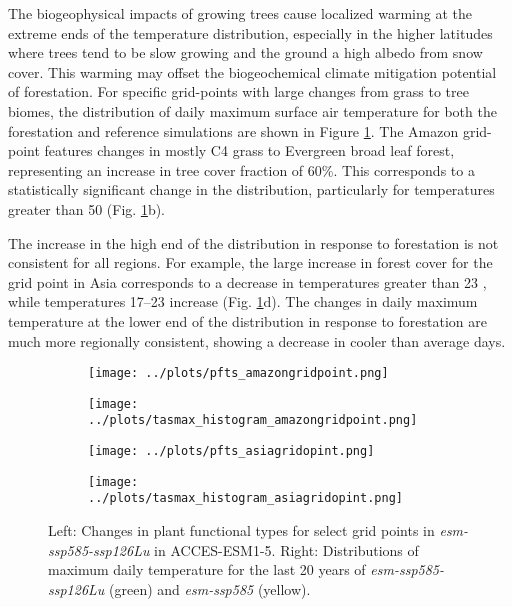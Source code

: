 \documentclass[]{article}
\begin{document}
The biogeophysical impacts of growing trees cause localized warming at the extreme ends of the temperature distribution, especially in the higher latitudes where trees tend to be slow growing and the ground a high albedo from snow cover.
This warming may offset the biogeochemical climate mitigation potential of forestation.
For specific grid-points with large changes from grass to tree biomes, the distribution of daily maximum surface air temperature for both the forestation and reference simulations are shown in Figure \ref{fig:tasmax_distribution}.
The Amazon grid-point features changes in mostly C4 grass to Evergreen broad leaf forest, representing an increase in tree cover fraction of 60\%.
This corresponds to a statistically significant change in the distribution, particularly for temperatures greater than 50 \textcelsius{} (Fig. \ref{fig:tasmax_distribution}b).

The increase in the high end of the distribution in response to forestation is not consistent for all regions.
For example, the large increase in forest cover for the grid point in Asia corresponds to a decrease in temperatures greater than 23 \textcelsius{}, while temperatures 17--23 \textcelsius{} increase (Fig. \ref{fig:tasmax_distribution}d).
The changes in daily maximum temperature at the lower end of the distribution in response to forestation are much more regionally consistent, showing a decrease in cooler than average days.

\begin{figure}[H]
    \centering
    \begin{subfigure}[b]{0.4\linewidth}
        \texttt{[image: ../plots/pfts\_amazongridpoint.png]}
    \end{subfigure}
    \begin{subfigure}[b]{0.4\linewidth}
        \texttt{[image: ../plots/tasmax\_histogram\_amazongridpoint.png]}
    \end{subfigure}
    \begin{subfigure}[b]{0.4\linewidth}
        \texttt{[image: ../plots/pfts\_asiagridopint.png]}
    \end{subfigure}
    \begin{subfigure}[b]{0.4\linewidth}
        \texttt{[image: ../plots/tasmax\_histogram\_asiagridopint.png]}
    \end{subfigure}
    \caption{Left: Changes in plant functional types for select grid points in \textit{esm-ssp585-ssp126Lu} in ACCES-ESM1-5. Right: Distributions of maximum daily temperature for the last 20 years of \textit{esm-ssp585-ssp126Lu} (green) and \textit{esm-ssp585} (yellow).}
    \label{fig:tasmax_distribution}
\end{figure}
\end{document}
